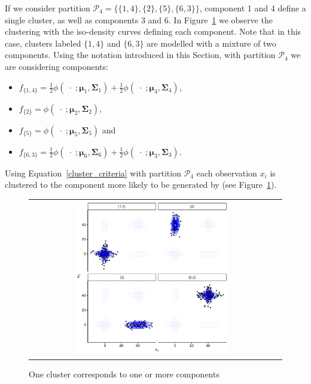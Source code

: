 \documentclass[10pt, a4paper]{article}
\newcommand{\m}[1]{\boldsymbol{#1}}
\begin{document}
\begin{spacing}{1.9}
If we consider partition $\mathcal{P}_4 = \{ \{1, 4\},\{2\}, \{5\}, \{6, 3\} \}$, component 1 and 4 define a single cluster, as well as components 3 and 6. In Figure~\ref{ex_two_one} we observe the clustering with the iso-density curves defining each component. Note that in this case, clusters labeled $\{1,4\}$ and $\{6, 3\}$ are modelled with a mixture of two components. Using the notation introduced in this Section, with partition $\mathcal{P}_4$ we are considering components: 
\begin{itemize}
\item $f_{\{1,4\}} = \frac{1}{2} \phi(\;\cdot\; ;  \m\mu_1, \m\Sigma_1) + \frac{1}{2} \phi(\;\cdot\; ;  \m\mu_4, \m\Sigma_4)$, 
\item $f_{\{2\}} = \phi(\;\cdot\; ;  \m\mu_2, \m\Sigma_2)$, 
\item $f_{\{5\}} = \phi(\;\cdot\; ;  \m\mu_5, \m\Sigma_5)$ and
\item $f_{\{6,3\}} = \frac{1}{2} \phi(\;\cdot\; ;  \m\mu_6, \m\Sigma_6) + \frac{1}{2} \phi(\;\cdot\; ;  \m\mu_3, \m\Sigma_3)$.
\end{itemize}

Using Equation~\ref{cluster_criteria} with partition $\mathcal{P}_4$ each observation $x_i$ is clustered to the component more likely to be generated by (see Figure~\ref{ex_two_one}).

\begin{figure}[h]
\begin{center}
\begin{tabular}{cc}
  \includegraphics[width=0.65\textwidth]{figures/partition-example-part4.pdf} \\
 \end{tabular}
 \caption{One cluster corresponds to one or more components}\label{ex_two_one}
\end{center}
\end{figure}



\end{spacing}
\end{document}
